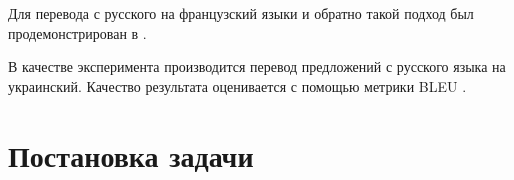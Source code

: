 \documentclass[12pt,twoside]{article}
\begin{document}
Для перевода с русского на французский языки и обратно такой подход был продемонстрирован в \cite{lample2017unsupervised}.

В качестве эксперимента производится перевод предложений с русского языка на украинский. Качество результата оценивается с помощью метрики BLEU \cite{papineni2002bleu}.

\section{Постановка задачи}







\end{document}
